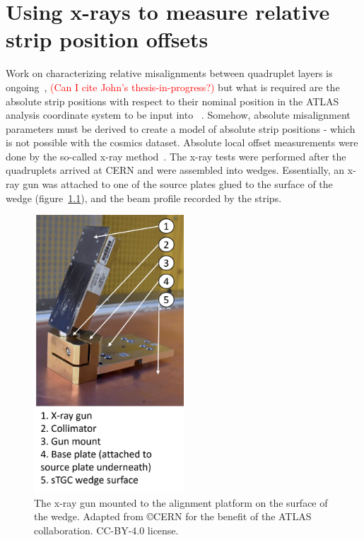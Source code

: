 
\chapter{Using x-rays to measure relative strip position offsets}
\label{chap:xray}


Work on characterizing relative misalignments between quadruplet layers is ongoing~\cite{zhao_cosmic_2019}, \textcolor{red}{(Can I cite John's thesis-in-progress?)} but what is required are the absolute strip positions with respect to their nominal position in the ATLAS analysis coordinate system to be input into ~\cite{the_atlas_collaboration_athena}. Somehow, absolute misalignment parameters must be derived to create a model of absolute strip positions - which is not possible with the cosmics dataset. Absolute local offset measurements were done by the so-called x-ray method~\cite{lefebvre_precision_2020}. The x-ray tests were performed after the quadruplets arrived at CERN and were assembled into wedges. Essentially, an x-ray gun was attached to one of the source plates glued to the surface of the wedge (figure~\ref{fig:xray_setup}), and the beam profile recorded by the strips.

\begin{figure}
    \centering
    \includegraphics[width = 0.5\textwidth]{figures/figure_xray_setup.pdf}
    \caption{The x-ray gun mounted to the alignment platform on the surface of the wedge. Adapted from \copyright  CERN for the benefit of the ATLAS collaboration. CC-BY-4.0 license.}
    \label{fig:xray_setup}
\end{figure}

